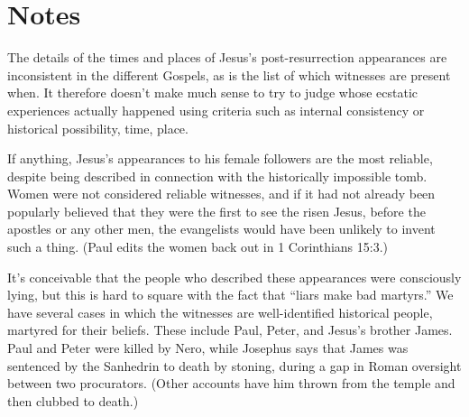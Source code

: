 \documentclass[10pt,twoside]{article} %
\newcommand{\quotesize}{\normalsize{}}
\newcommand{\maintextquotesize}{\renewcommand{\quotesize}{\large{}}}
\newcommand{\notequotesize}{\renewcommand{\quotesize}{\normalsize{}}}
\newenvironment{notesection}[1]{
  \setcounter{secnumdepth}{0}          %
  \section{#1}
  \setcounter{secnumdepth}{2}          %
  \notequotesize
}%
{
  \maintextquotesize
}
\begin{document}
\begin{notesection}{Notes}
The details of the times and places of Jesus's post-resurrection appearances are inconsistent in the
different Gospels, as is the list of which witnesses are present when. It therefore doesn't make much
sense to try to judge whose ecstatic experiences actually happened using criteria such as internal consistency
or historical possibility, time, place.

If anything, Jesus's appearances to his female followers are the most
reliable, despite being described in connection with the historically impossible tomb. Women were not considered reliable witnesses,
and if it had not already been popularly believed that they were the first to see the risen Jesus, before the apostles or any other men, the
evangelists would have been unlikely to invent such a thing. (Paul edits the women back out in 1 Corinthians 15:3.)

It's conceivable that the people who described these appearances were consciously lying, but this is hard to square
with the fact that ``liars make bad martyrs.'' We have several cases in which the witnesses are well-identified
historical people, martyred for their beliefs. These include Paul, Peter, and Jesus's brother James.
Paul and Peter were killed by Nero, while Josephus says that James was sentenced by the Sanhedrin to death by stoning,
during a gap in Roman oversight between two procurators. (Other accounts have him thrown from the temple and then clubbed to death.)


\end{notesection}
\end{document}
